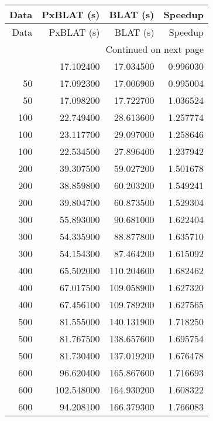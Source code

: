 \begin{longtable}{rrrr}
	\toprule
	Data & PxBLAT (s) & BLAT (s)   & Speedup   \\
	\midrule
	\endfirsthead
	\toprule
	Data & PxBLAT (s) & BLAT (s)   & Speedup   \\
	\midrule
	\endhead
	\midrule
	\multicolumn{4}{r}{Continued on next page} \\
	\midrule
	\endfoot
	\bottomrule
	\endlastfoot
	50   & 17.102400  & 17.034500  & 0.996030  \\
	50   & 17.092300  & 17.006900  & 0.995004  \\
	50   & 17.098200  & 17.722700  & 1.036524  \\
	100  & 22.749400  & 28.613600  & 1.257774  \\
	100  & 23.117700  & 29.097000  & 1.258646  \\
	100  & 22.534500  & 27.896400  & 1.237942  \\
	200  & 39.307500  & 59.027200  & 1.501678  \\
	200  & 38.859800  & 60.203200  & 1.549241  \\
	200  & 39.804700  & 60.873500  & 1.529304  \\
	300  & 55.893000  & 90.681000  & 1.622404  \\
	300  & 54.335900  & 88.877800  & 1.635710  \\
	300  & 54.154300  & 87.464200  & 1.615092  \\
	400  & 65.502000  & 110.204600 & 1.682462  \\
	400  & 67.017500  & 109.058900 & 1.627320  \\
	400  & 67.456100  & 109.789200 & 1.627565  \\
	500  & 81.555000  & 140.131900 & 1.718250  \\
	500  & 81.767500  & 138.657600 & 1.695754  \\
	500  & 81.730400  & 137.019200 & 1.676478  \\
	600  & 96.620400  & 165.867600 & 1.716693  \\
	600  & 102.548000 & 164.930200 & 1.608322  \\
	600  & 94.208100  & 166.379300 & 1.766083  \\
\end{longtable}
